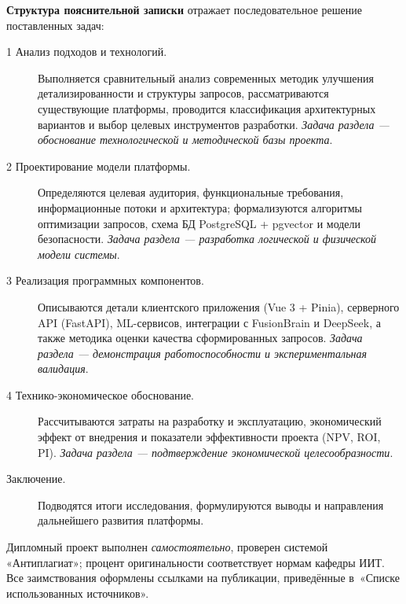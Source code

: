 \bigskip
\textbf{Структура пояснительной записки} отражает последовательное
решение поставленных задач:

\begin{description}
  \item[1 Анализ подходов и технологий.]
        Выполняется сравнительный анализ современных методик
        улучшения детализированности и структуры запросов,
        рассматриваются существующие платформы, проводится
        классификация архитектурных вариантов и выбор целевых
        инструментов разработки.  \emph{Задача раздела —
        обоснование технологической и методической базы проекта}.
  \item[2 Проектирование модели платформы.]
        Определяются целевая аудитория, функциональные требования,
        информационные потоки и архитектура; формализуются алгоритмы
        оптимизации запросов, схема БД PostgreSQL + pgvector и
        модели безопасности.  \emph{Задача раздела —
        разработка логической и физической модели системы}.
  \item[3 Реализация программных компонентов.]
        Описываются детали клиентского приложения (Vue 3 + Pinia),
        серверного API (FastAPI), ML-сервисов, интеграции с FusionBrain
        и DeepSeek, а также методика оценки качества сформированных
        запросов.  \emph{Задача раздела — демонстрация
        работоспособности и экспериментальная валидация}.
  \item[4 Технико-экономическое обоснование.]
        Рассчитываются затраты на разработку и эксплуатацию,
        экономический эффект от внедрения и показатели
        эффективности проекта (NPV, ROI, PI).  \emph{Задача раздела —
        подтверждение экономической целесообразности}.
  \item[Заключение.]
        Подводятся итоги исследования, формулируются выводы и
        направления дальнейшего развития платформы.
\end{description}

\bigskip
Дипломный проект выполнен \emph{самостоятельно}, проверен системой
«Антиплагиат»; процент оригинальности соответствует нормам кафедры ИИТ.
Все заимствования оформлены ссылками на публикации, приведённые
в~«Списке использованных источников».
